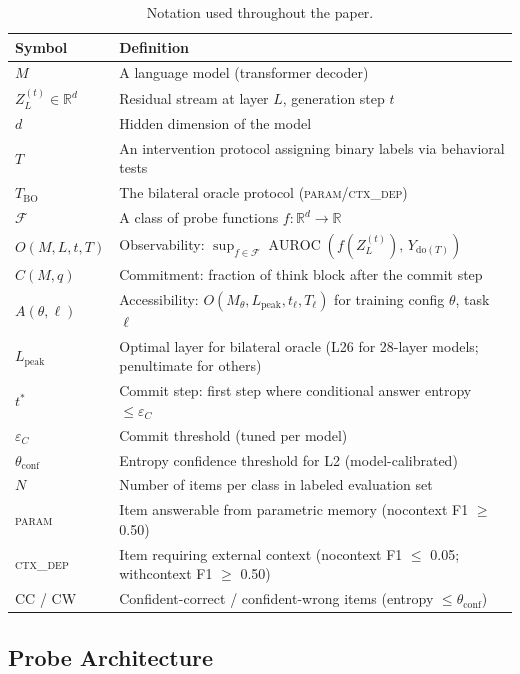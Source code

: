 \documentclass[11pt]{article}
\begin{document}
\begin{table}[h!]
\centering
\small
\caption{Notation used throughout the paper.}
\begin{tabular}{lL{9cm}}
\toprule
Symbol & Definition \\
\midrule
$M$ & A language model (transformer decoder) \\
$Z_L^{(t)} \in \mathbb{R}^d$ & Residual stream at layer $L$, generation step $t$ \\
$d$ & Hidden dimension of the model \\
$T$ & An intervention protocol assigning binary labels via behavioral tests \\
$T_{\mathrm{BO}}$ & The bilateral oracle protocol (\textsc{param}/\textsc{ctx\_dep}) \\
$\mathcal{F}$ & A class of probe functions $f : \mathbb{R}^d \to \mathbb{R}$ \\
$O(M,L,t,T)$ & Observability: $\sup_{f \in \mathcal{F}} \operatorname{AUROC}(f(Z_L^{(t)}),\, Y_{\mathrm{do}(T)})$ \\
$C(M,q)$ & Commitment: fraction of think block after the commit step \\
$A(\theta,\ell)$ & Accessibility: $O(M_\theta, L_{\text{peak}}, t_\ell, T_\ell)$ for training config $\theta$, task $\ell$ \\
$L_{\text{peak}}$ & Optimal layer for bilateral oracle (L26 for 28-layer models; penultimate for others) \\
$t^*$ & Commit step: first step where conditional answer entropy $\leq \varepsilon_C$ \\
$\varepsilon_C$ & Commit threshold (tuned per model) \\
$\theta_{\text{conf}}$ & Entropy confidence threshold for L2 (model-calibrated) \\
$N$ & Number of items per class in labeled evaluation set \\
\textsc{param} & Item answerable from parametric memory (nocontext F1 $\geq$ 0.50) \\
\textsc{ctx\_dep} & Item requiring external context (nocontext F1 $\leq$ 0.05; withcontext F1 $\geq$ 0.50) \\
CC / CW & Confident-correct / confident-wrong items (entropy $\leq \theta_{\text{conf}}$) \\
\bottomrule
\end{tabular}
\end{table}

\subsection{Probe Architecture}
\end{document}
